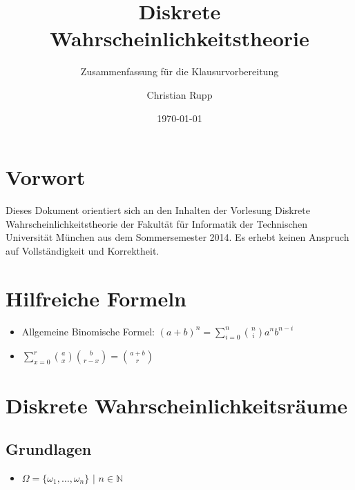 \documentclass[a4,12pt]{scrartcl}
\title{Diskrete Wahrscheinlichkeitstheorie}
\subtitle{Zusammenfassung für die Klausurvorbereitung}
\author{Christian Rupp}
\date{\today}
\begin{document}
\maketitle

\newpage

\tableofcontents

\section{Vorwort}

Dieses Dokument orientiert sich an den Inhalten der Vorlesung Diskrete Wahrscheinlichkeitstheorie der Fakultät für Informatik der Technischen Universität München aus dem Sommersemester 2014.
Es erhebt keinen Anspruch auf Vollständigkeit und Korrektheit.

\section{Hilfreiche Formeln}

\begin{itemize}
\item Allgemeine Binomische Formel: $(a+b)^n=\sum^n_{i=0}\binom {n}{i}a^nb^{n-i}$
\item $\sum^r_{x=0}\binom{a}{x}\binom{b}{r-x}=\binom{a+b}{r}$
\end{itemize}

\section{Diskrete Wahrscheinlichkeitsräume}

\subsection{Grundlagen}

\begin{itemize}
\item $\Omega = \{\omega_1,\ldots,\omega_n\}$ $|$ $n\in \mathbb{N}$
\end{itemize}
\end{document}
